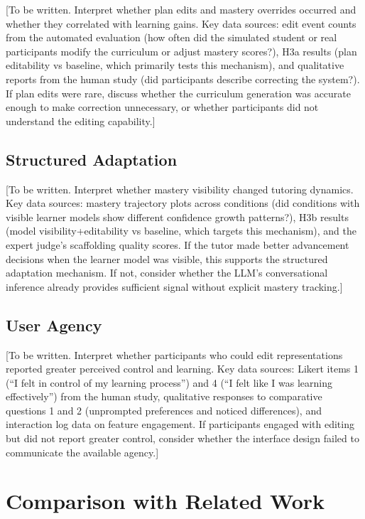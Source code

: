 \documentclass[logo,bsc,singlespacing,parskip,online]{infthesis}
\begin{document}
[To be written. Interpret whether plan edits and mastery overrides occurred and whether they correlated with learning gains. Key data sources: edit event counts from the automated evaluation (how often did the simulated student or real participants modify the curriculum or adjust mastery scores?), H3a results (plan editability vs baseline, which primarily tests this mechanism), and qualitative reports from the human study (did participants describe correcting the system?). If plan edits were rare, discuss whether the curriculum generation was accurate enough to make correction unnecessary, or whether participants did not understand the editing capability.]

\subsection{Structured Adaptation}

[To be written. Interpret whether mastery visibility changed tutoring dynamics. Key data sources: mastery trajectory plots across conditions (did conditions with visible learner models show different confidence growth patterns?), H3b results (model visibility+editability vs baseline, which targets this mechanism), and the expert judge's scaffolding quality scores. If the tutor made better advancement decisions when the learner model was visible, this supports the structured adaptation mechanism. If not, consider whether the LLM's conversational inference already provides sufficient signal without explicit mastery tracking.]

\subsection{User Agency}

[To be written. Interpret whether participants who could edit representations reported greater perceived control and learning. Key data sources: Likert items 1 (``I felt in control of my learning process'') and 4 (``I felt like I was learning effectively'') from the human study, qualitative responses to comparative questions 1 and 2 (unprompted preferences and noticed differences), and interaction log data on feature engagement. If participants engaged with editing but did not report greater control, consider whether the interface design failed to communicate the available agency.]

\section{Comparison with Related Work}
\end{document}
